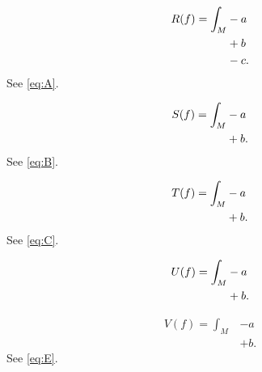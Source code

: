 \documentclass{article}
\begin{document}
\setcounter{equation}{5}

\begin{align}
\label{eq:A}
R(f)=\int_M&
-a \notag\\
&+b \notag\\
&-c .
\end{align}
See \eqref{eq:A}.

\begin{align}
\label{eq:B}
S(f)=\int_M&
-a \\
&+b \notag.
\end{align}
See \eqref{eq:B}.

\begin{align}
\label{eq:C}
T(f)=\int_M&
-a \notag\\
&+b .
\end{align}
See \eqref{eq:C}.

\begin{align}
U(f)=\int_M&
-a \notag\\
&+b \notag.
\end{align}

\begin{align}
\label{eq:E}
V(f)=\int_M&
-a \nonumber\\
&+b .
\end{align}
See \eqref{eq:E}.
\end{document}
